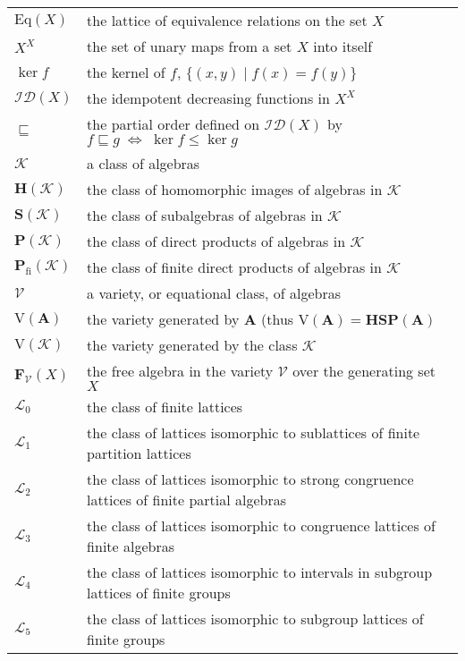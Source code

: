 \documentclass[cm,dissertation]{uhthesis}
\theoremstyle{plain}
\theoremstyle{definition}
\theoremstyle{remark}
\numberwithin{theorem}{section}
\numberwithin{claim}{chapter}
\numberwithin{equation}{section}
\numberwithin{conjecture}{chapter}
\newcommand{\<}{\ensuremath{\langle}}
\renewcommand{\>}{\ensuremath{\rangle}}
\renewcommand{\leq}{\ensuremath{\leqslant}}
\newcommand{\ID}[1]{\ensuremath{\mathcal{ID}(#1)}}
\newcommand{\Eq}{\ensuremath{\mathrm{Eq}}}
\newcommand{\0}{\ensuremath{\mathbf{0}}}
\newcommand{\1}{\ensuremath{\mathbf{1}}}
\newcommand{\2}{\ensuremath{\mathbf{2}}}
\newcommand{\3}{\ensuremath{\mathbf{3}}}
\newcommand{\4}{\ensuremath{\mathbf{4}}}
\newcommand{\5}{\ensuremath{\mathbf{5}}}
\newcommand{\bA}{\ensuremath{\mathbf{A}}}
\newcommand{\bF}{\ensuremath{\mathbf{F}}}
\newcommand{\bH}{\ensuremath{\mathbf{H}}}
\newcommand{\sK}{\ensuremath{\mathscr{K}}}
\newcommand{\sL}{\ensuremath{\mathscr{L}}}
\newcommand{\bP}{\ensuremath{\mathbf{P}}}
\newcommand{\bS}{\ensuremath{\mathbf{S}}}
\newcommand{\V}{\ensuremath{\mathrm{V}}}
\newcommand{\sV}{\ensuremath{\mathscr{V}}}
\begin{document}
\begin{frontmatter}
{\begin{table}[h!]
\begin{tabular}{ll}
      $\Eq(X)$& the lattice of equivalence relations on the set $X$\\
      $X^X$ & the set of unary maps from a set $X$ into itself\\
      $\ker f$ & the kernel of $f$, $\{(x,y) \mid f(x) = f(y)\}$\\
      $\ID{X}$ & the idempotent decreasing functions in $X^X$\\
      $\sqsubseteq$ & the partial order defined on $\ID{X}$ by $f\sqsubseteq g \;
      \Leftrightarrow \; \ker f \leq \ker g$\\
      $\sK$ & a class of algebras\\
      $\bH (\sK)$ & the class of homomorphic images of algebras in $\sK$\\
      $\bS (\sK)$ & the class of subalgebras of algebras in $\sK$\\
      $\bP (\sK)$ & the class of direct products of algebras in $\sK$\\
      $\bP_{\mathrm{fi}} (\sK)$ & the class of finite direct products of
      algebras in $\sK$\\ 
      $\sV$ & a variety, or equational class, of algebras\\
      $\V(\bA)$ & the variety generated by $\bA$ 
      (thus $\V(\bA) = \bH \bS \bP(\bA)$\\
      $\V(\sK)$ & the variety generated by the class $\sK$\\
      $\bF_{\sV}(X)$& the free algebra in the variety $\sV$ over the
      generating set $X$\\
      $\sL_0$ & the class of finite lattices\\
      $\sL_1$ & the class of lattices isomorphic to sublattices of finite partition lattices\\
      $\sL_2$ & the class of lattices isomorphic to strong congruence lattices of
      finite partial algebras\\
      $\sL_3$ & the class of lattices isomorphic to congruence lattices of finite algebras\\
      $\sL_4$ & the class of lattices isomorphic to intervals in subgroup lattices of finite groups\\
      $\sL_5$ & the class of lattices isomorphic to subgroup lattices of finite groups\\
    \end{tabular}
\end{table}
}

\end{frontmatter}
\end{document}
